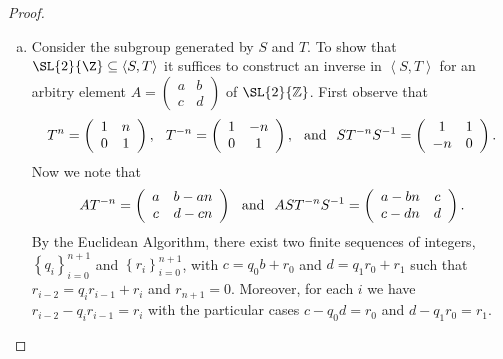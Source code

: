 \documentclass[10pt]{amsart}
\begin{document}
\begin{thm}
\begin{proof}
\begin{enumerate}[(a)]
    \item
      Consider the subgroup generated by $S$ and $T$.
      To show that $\SL{2}{\Z} \subseteq \left<S,T\right>$ it suffices to construct an inverse in $\left<S,T\right>$ for an arbitry element $A  = \left(\begin{array}{cc}a & b\\c & d\end{array}\right)$ of $\SL{2}{\mathbb{Z}}$.
      First observe that 
      $$T^{n} = \left(
      \begin{array}{cc}
        1 & n\\
        0 & 1
        \end{array}
      \right),
      \hspace{2.5mm}
      T^{-n} = 
      \left(
      \begin{array}{cc}
        1 & -n\\
        0 & 1
        \end{array}
      \right),
      \hspace{2.5mm}
      \text{and}
      \hspace{2.5mm}
      ST^{-n}S^{-1} = 
      \left(
      \begin{array}{cc}
        1 &  1\\
        -n & 0
        \end{array}
      \right).
      $$
      Now we note that 
      $$AT^{-n} = 
      \left(
      \begin{array}{cc}
        a & b - an\\
        c & d - cn
        \end{array}
      \right)
      \hspace{2.5mm}
      \text{and}
      \hspace{2.5mm}
      AST^{-n}S^{-1} = 
      \left(
      \begin{array}{cc}
        a - bn & c\\
        c - dn & d
        \end{array}
      \right).
      $$
      By the Euclidean Algorithm, there exist two finite sequences of integers, $\left\{q_i\right\}_{i=0}^{n+1}$ and $\left\{r_i\right\}_{i=0}^{n+1}$, with $c = q_0b + r_0$ and $d = q_1r_0 + r_1$ such that $r_{i-2} = q_ir_{i-1} + r_i$ and $r_{n+1} = 0$.
      Moreover, for each $i$ we have $r_{i-2} - q_ir_{i-1} = r_i$ with the particular cases $c - q_0d = r_0$ and $d - q_1r_0 = r_1$.
      

\end{enumerate}
\end{proof}
\end{thm}
\end{document}
